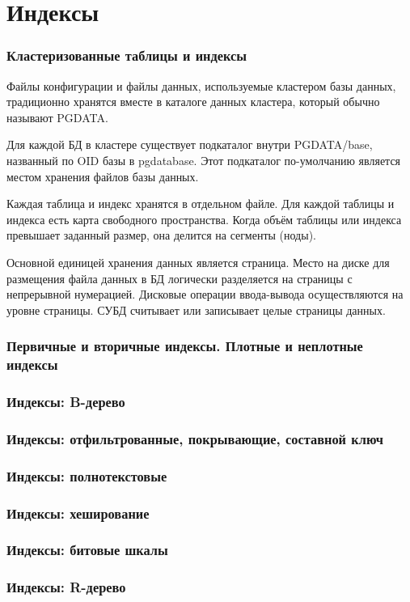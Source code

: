 \part{Индексы}

\section{Кластеризованные таблицы и индексы}

Файлы конфигурации и файлы данных, используемые кластером базы данных, традиционно хранятся вместе в каталоге данных кластера, который обычно называют PGDATA.

Для каждой БД в кластере существует подкаталог внутри PGDATA/base, названный по OID базы в pg\textunderscore database.
Этот подкаталог по-умолчанию является местом хранения файлов базы данных.

Каждая таблица и индекс хранятся в отдельном файле.
Для каждой таблицы и индекса есть карта свободного пространства.
Когда объём таблицы или индекса превышает заданный размер, она делится на сегменты (ноды).

Основной единицей хранения данных является страница.
Место на диске для размещения файла данных в БД логически разделяется на страницы с непрерывной нумерацией.
Дисковые операции ввода-вывода осуществляются на уровне страницы.
СУБД считывает или записывает целые страницы данных.

\section{Первичные и вторичные индексы. Плотные и неплотные индексы}

\section{Индексы: B-дерево}

\section{Индексы: отфильтрованные, покрывающие, составной ключ}

\section{Индексы: полнотекстовые}

\section{Индексы: хеширование}

\section{Индексы: битовые шкалы}

\section{Индексы: R-дерево}
